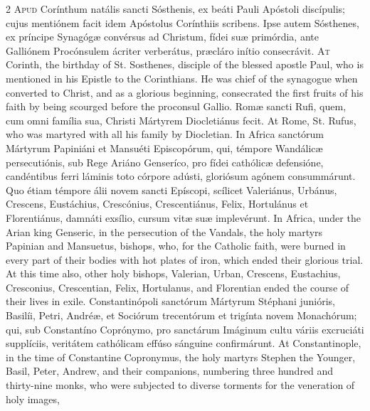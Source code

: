\begin{paracol}{2}
\lettrine[lines=2]{A}{pud} Corínthum natális 
 sancti Sósthenis, ex beáti Pauli Apóstoli discípulis; cujus mentiónem facit 
 idem Apóstolus Corínthiis scribens. Ipse autem Sósthenes, ex príncipe 
 Synagógæ convérsus ad Christum, fídei suæ primórdia, ante Galliónem 
 Procónsulem ácriter verberátus, præcláro inítio consecrávit.
\switchcolumn
{}
\lettrine[lines=2]{A}{t} Corinth, the birthday of St. 
 Sosthenes, disciple of the blessed apostle Paul, who is mentioned in his 
 Epistle to the Corinthians. He was chief of the synagogue when 
 converted to Christ, and as a glorious beginning, consecrated the first 
 fruits of his faith by being scourged before the proconsul Gallio.
\switchcolumn*
{}
Romæ sancti Rufi, quem, 
 cum omni família sua, Christi Mártyrem Diocletiánus fecit.
\switchcolumn
{}
At Rome, St. Rufus, who was martyred 
 with all his family by Diocletian.
\switchcolumn*
{}
In Africa sanctórum 
 Mártyrum Papiniáni et Mansuéti Episcopórum, qui, témpore Wandálicæ 
 persecutiónis, sub Rege Ariáno Genseríco, pro fídei cathólicæ defensióne, 
 candéntibus ferri láminis toto córpore adústi, gloriósum agónem consummárunt. 
 Quo étiam témpore álii novem sancti Epíscopi, scílicet Valeriánus, Urbánus, 
 Crescens, Eustáchius, Crescónius, Crescentiánus, Felix, Hortulánus et 
 Florentiánus, damnáti exsílio, cursum vitæ suæ implevérunt.
\switchcolumn
{}
In Africa, under the Arian king 
 Genseric, in the persecution of the Vandals, the holy martyrs Papinian and 
 Mansuetus, bishops, who, for the Catholic faith, were burned in every part 
 of their bodies with hot plates of iron, which ended their glorious trial. 
 At this time also, other holy bishops, Valerian, Urban, Crescens, Eustachius, 
 Cresconius, Crescentian, Felix, Hortulanus, and Florentian ended the course 
 of their lives in exile.
\switchcolumn*
{}
Constantinópoli 
 sanctórum Mártyrum Stéphani junióris, Basilíi, Petri, Andréæ, et Sociórum 
 trecentórum et trigínta novem Monachórum; qui, sub Constantíno Coprónymo, 
 pro sanctárum Imáginum cultu váriis excruciáti supplíciis, veritátem 
 cathólicam effúso sánguine confirmárunt.
\switchcolumn
{}
At Constantinople, in the time of 
 Constantine Copronymus, the holy martyrs Stephen the Younger, Basil, Peter, 
 Andrew, and their companions, numbering three hundred and thirty-nine monks, 
 who were subjected to diverse torments for the veneration of holy images, 

\end{paracol}
